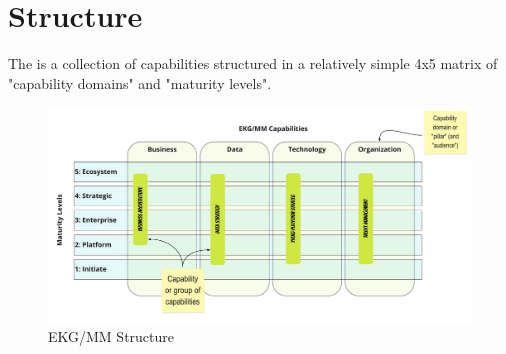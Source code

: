 \chapter{Structure}\label{ch:ekg-mm-structure}

The  is a collection of capabilities structured in a relatively simple 4x5 matrix of
"capability domains" and "maturity levels".

\begin{figure}[ht]
    \centering
    \includegraphics[width=\textwidth]{../images/ekg-mm-structure.pdf}
    \caption{EKG/MM Structure}
    \label{fig:ekg-mm-structure}
\end{figure}









